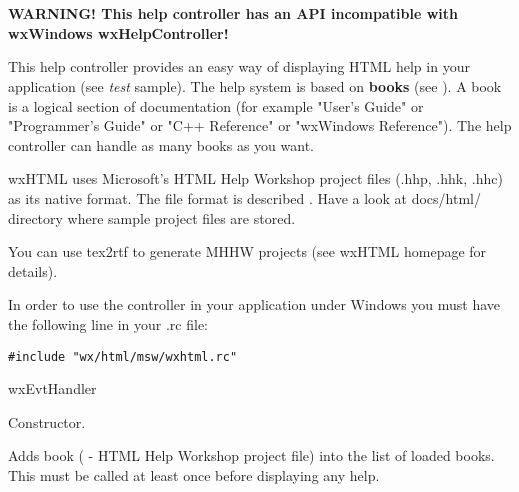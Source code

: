 %
%

\section{}\label{wxhtmlhelpcontroller}

{\bf WARNING! This help controller has an API incompatible with wxWindows
wxHelpController!}

This help controller provides an easy way of displaying HTML help in your
application (see {\it test} sample). The help system is based on {\bf books} 
(see ). A book is a logical
section of documentation (for example "User's Guide" or "Programmer's Guide" or
"C++ Reference" or "wxWindows Reference"). The help controller can handle as
many books as you want.

wxHTML uses Microsoft's HTML Help Workshop project files (.hhp, .hhk, .hhc) as its
native format. The file format is described .
Have a look at docs/html/ directory where sample project files are stored.

You can use tex2rtf to generate MHHW projects (see wxHTML homepage for details).

In order to use the controller in your application under Windows you must
have the following line in your .rc file:

\begin{verbatim}
#include "wx/html/msw/wxhtml.rc"
\end{verbatim}


wxEvtHandler


\label{wxhtmlhelpcontrollerwxhtmlhelpcontroller}


Constructor.

\label{wxhtmlhelpcontrolleraddbook}


Adds book ( - HTML Help Workshop project file) into the list of loaded books.
This must be called at least once before displaying  any help.

